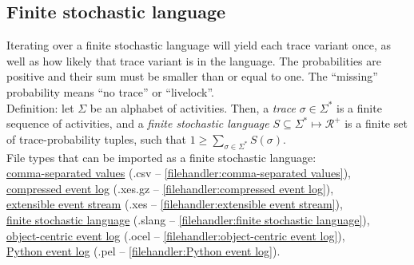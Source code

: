 {\subsection{Finite stochastic language}
\label{trait:finite stochastic language}
Iterating over a finite stochastic language will yield each trace variant once, as well as how likely that trace variant is in the language.
            The probabilities are positive and their sum must be smaller than or equal to one.
            The ``missing'' probability means ``no trace'' or ``livelock''.
            \\
            Definition: let $\Sigma$ be an alphabet of activities.
            Then, a \emph{trace} $\sigma \in \Sigma^*$ is a finite sequence of activities, and 
            a \emph{finite stochastic language} $S \subseteq \Sigma^* \mapsto \mathcal{R}^+$ is a finite set of trace-probability tuples, such that $1 \geq \sum_{\sigma \in \Sigma^*} S(\sigma) $.
\\File types that can be imported as a finite stochastic language: \\\null\qquad\hyperref[filehandler:comma-separated values]{comma-separated values} (.csv -- \cref{filehandler:comma-separated values}), \\\null\qquad\hyperref[filehandler:compressed event log]{compressed event log} (.xes.gz -- \cref{filehandler:compressed event log}), \\\null\qquad\hyperref[filehandler:extensible event stream]{extensible event stream} (.xes -- \cref{filehandler:extensible event stream}), \\\null\qquad\hyperref[filehandler:finite stochastic language]{finite stochastic language} (.slang -- \cref{filehandler:finite stochastic language}), \\\null\qquad\hyperref[filehandler:object-centric event log]{object-centric event log} (.ocel -- \cref{filehandler:object-centric event log}), \\\null\qquad\hyperref[filehandler:Python event log]{Python event log} (.pel -- \cref{filehandler:Python event log}).
}
